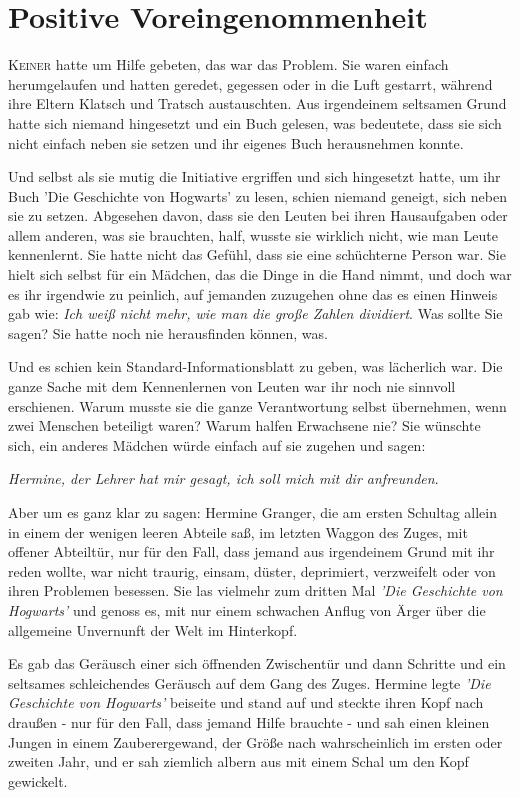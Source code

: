 \chapter{Positive Voreingenommenheit}

\lettrine{K}{einer} hatte um Hilfe gebeten, das war das Problem. Sie waren
einfach herumgelaufen und hatten geredet, gegessen oder in die Luft gestarrt,
während ihre Eltern Klatsch und Tratsch austauschten. Aus irgendeinem seltsamen
Grund hatte sich niemand hingesetzt und ein Buch gelesen, was bedeutete, dass
sie sich nicht einfach neben sie setzen und ihr eigenes Buch herausnehmen
konnte.

Und selbst als sie mutig die Initiative ergriffen und sich hingesetzt hatte, um
ihr Buch 'Die Geschichte von Hogwarts' zu lesen, schien niemand geneigt, sich
neben sie zu setzen. Abgesehen davon, dass sie den Leuten bei ihren Hausaufgaben
oder allem anderen, was sie brauchten, half, wusste sie wirklich nicht, wie man
Leute kennenlernt. Sie hatte nicht das Gefühl, dass sie eine schüchterne Person
war. Sie hielt sich selbst für ein Mädchen, das die Dinge in die Hand nimmt, und
doch war es ihr irgendwie zu peinlich, auf jemanden zuzugehen ohne das es einen
Hinweis gab wie: \glqq \emph{Ich weiß nicht mehr, wie man die große Zahlen
dividiert}\grqq{}. \glqq Was sollte Sie sagen? Sie hatte noch nie herausfinden
können, was.

Und es schien kein Standard-Informationsblatt zu geben, was lächerlich war. Die
ganze Sache mit dem Kennenlernen von Leuten war ihr noch nie sinnvoll
erschienen. Warum musste sie die ganze Verantwortung selbst übernehmen, wenn
zwei Menschen beteiligt waren? Warum halfen Erwachsene nie? Sie wünschte sich,
ein anderes Mädchen würde einfach auf sie zugehen und sagen:

\glqq \emph{Hermine, der Lehrer hat mir gesagt, ich soll mich mit dir
anfreunden}.\grqq{}

Aber um es ganz klar zu sagen: Hermine Granger, die am ersten Schultag allein in
einem der wenigen leeren Abteile saß, im letzten Waggon des Zuges, mit offener
Abteiltür, nur für den Fall, dass jemand aus irgendeinem Grund mit ihr reden
wollte, war nicht traurig, einsam, düster, deprimiert, verzweifelt oder von
ihren Problemen besessen. Sie las vielmehr zum dritten Mal \emph{'Die Geschichte
von Hogwarts' }und genoss es, mit nur einem schwachen Anflug von Ärger über die
allgemeine Unvernunft der Welt im Hinterkopf.

Es gab das Geräusch einer sich öffnenden Zwischentür und dann Schritte und ein
seltsames schleichendes Geräusch auf dem Gang des Zuges. Hermine legte
\emph{'Die Geschichte von Hogwarts'} beiseite und stand auf und steckte ihren
Kopf nach draußen - nur für den Fall, dass jemand Hilfe brauchte - und sah einen
kleinen Jungen in einem Zauberergewand, der Größe nach wahrscheinlich im ersten
oder zweiten Jahr, und er sah ziemlich albern aus mit einem Schal um den Kopf
gewickelt.

